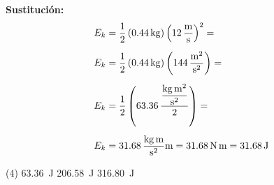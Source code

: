 \documentclass[12pt, letter]{exam}
\begin{document}
\begin{questions}
    \vspace*{0.3cm}
    \textbf{Sustitución:}
    \begin{align*}
    E_{k} &= \dfrac{1}{2} \left( \SI{0.44}{\kilo\gram} \right) \left( \SI[per-mode=fraction]{12}{\meter\per\second} \right)^{2} = \\[0.5em]
    E_{k} &= \dfrac{1}{2} \left( \SI{0.44}{\kilo\gram} \right) \left( \SI[per-mode=fraction]{144}{\square\meter\per\square\second} \right) = \\[0.5em]
    E_{k} &= \dfrac{1}{2} \left( \num{63.36} \, \dfrac{\displaystyle \unit[per-mode=fraction]{\kilo\gram\square\meter\per\square\second}}{2} \right) = \\[0.5em]
    E_{k} &= \num{31.68} \, \unit[per-mode=fraction]{\kilo\gram\meter\per\square\second} \unit{\meter} = \SI{31.68}{\newton\meter} = \SI{31.68}{\joule}
    \end{align*}
    \begin{tasks}(4)
        \task {}
        \task \SI{63.36}{\joule}
        \task \SI{206.58}{\joule}
        \task \SI{316.80}{\joule}
    \end{tasks}



\end{questions}
\end{document}
